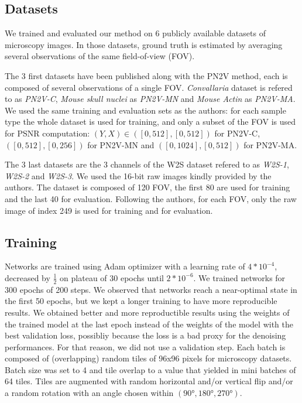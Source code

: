 \documentclass{article}
\begin{document}
\subsection{Datasets}
We trained and evaluated our method on 6 publicly available datasets of microscopy images. In those datasets, ground truth is estimated by averaging several observations of the same field-of-view (FOV).

The 3 first datasets have been published along with the PN2V method\cite{krull2019probabilistic}, each is composed of several observations of a single FOV. \emph{Convallaria} dataset is refered to as \emph{PN2V-C}, \emph{Mouse skull nuclei} as \emph{PN2V-MN} and \emph{Mouse Actin} as \emph{PN2V-MA}. We used the same training and evaluation sets as the authors: for each sample type the whole dataset is used for training, and only a subset of the FOV is used for PSNR computation: $(Y,X)\in([0, 512], [0, 512])$ for PN2V-C, $([0, 512], [0, 256])$ for PN2V-MN and $([0, 1024], [0, 512])$ for PN2V-MA.

The 3 last datasets are the 3 channels of the W2S dataset\cite{zhou2020w2s} refered to as \emph{W2S-1}, \emph{W2S-2} and \emph{W2S-3}. We used the 16-bit raw images kindly provided by the authors. The dataset is composed of 120 FOV, the first 80 are used for training and the last 40 for evaluation. Following the authors, for each FOV, only the raw image of index 249 is used for training and for evaluation.


\subsection{Training}
Networks are trained using Adam optimizer with a learning rate of $4*10^{-4}$, decreased by $\frac{1}{2}$ on plateau of 30 epochs until $2*10^{-6}$. We trained networks for 300 epochs of 200 steps. We observed that networks reach a near-optimal state in the first 50 epochs, but we kept a longer training to have more reproducible results.
We obtained better and more reproductible results using the weights of the trained model at the last epoch instead of the weights of the model with the best validation loss, possibliy because the loss is a bad proxy for the denoising performances. For that reason, we did not use a validation step.
Each batch is composed of (overlapping) random tiles of 96x96 pixels for microscopy datasets. Batch size was set to 4 and tile overlap to a value that yielded in mini batches of 64 tiles. Tiles are augmented with random horizontal and/or vertical flip and/or a random rotation with an angle chosen within $(90°, 180°, 270°)$.
\end{document}
